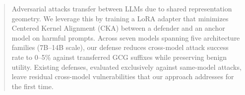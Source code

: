 \begin{abstract}

Adversarial attacks transfer between LLMs due to shared representation geometry. We leverage this by training a LoRA adapter that minimizes Centered Kernel Alignment (CKA) between a defender and an anchor model on harmful prompts. Across seven models spanning five architecture families (7B--14B scale), our defense reduces cross-model attack success rate to 0--5\% against transferred GCG suffixes while preserving benign utility. Existing defenses, evaluated exclusively against same-model attacks, leave residual cross-model vulnerabilities that our approach addresses for the first time.

\end{abstract}
